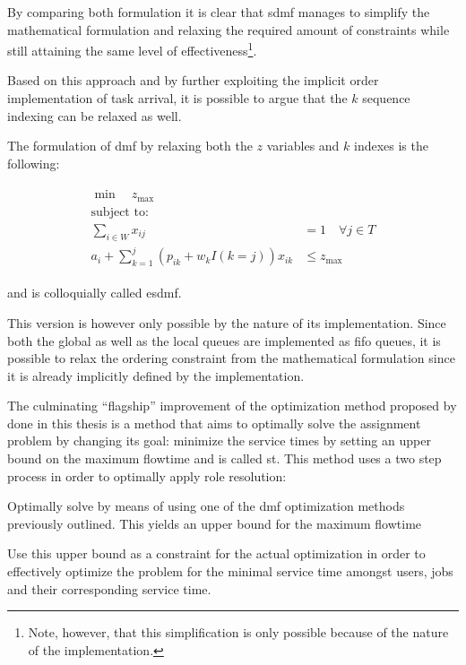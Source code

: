 By comparing both formulation it is clear that \gls{sdmf} manages to simplify the mathematical formulation and relaxing the required amount of constraints while still attaining the same level of effectiveness\footnote{Note, however, that this simplification is only possible because of the nature of the implementation.}. 

Based on this approach and by further exploiting the implicit order implementation of task arrival, it is possible to argue that the $k$ sequence indexing can be relaxed as well.

The formulation of \gls{dmf} by relaxing both the $z$ variables and $k$ indexes is the following:

\begin{align}
	\begin{split}
	    \min \quad z_{\text{max}}\\
	    \text{subject to:} \\
	    \sum_{i \in W} x_{ij} &= 1 \quad \forall j \in T\\
	    a_i + \sum_{k=1}^j (p_{ik} + w_k I(k=j))x_{ik} &\leq z_{\text{max}}
	\end{split}
\end{align}

and is colloquially called \gls{esdmf}.

This version is however only possible by the nature of its implementation. Since both the global as well as the local queues are implemented as \gls{fifo} queues, it is possible to relax the ordering constraint from the mathematical formulation since it is already implicitly defined by the implementation.

The culminating ``flagship'' improvement of the optimization method proposed by \citet{Zeng2005} done in this thesis is a method that aims to optimally solve the assignment problem by changing its goal: minimize the service times by setting an upper bound on the maximum flowtime and is called \gls{st}. This method uses a two step process in order to optimally apply role resolution:
\begin{enumerate*}
	\item Optimally solve by means of using one of the \gls{dmf} optimization methods previously outlined. This yields an upper bound for the maximum flowtime
	\item Use this upper bound as a constraint for the actual optimization in order to effectively optimize the problem for the minimal service time amongst users, jobs and their corresponding service time.
\end{enumerate*}

